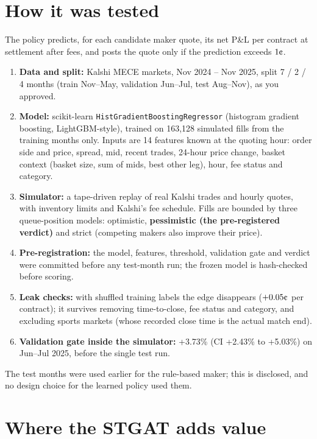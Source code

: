 \documentclass[11pt,a4paper]{article}
\newcommand{\cent}{\text{\textcent}}
\begin{document}
\section{How it was tested}

The policy predicts, for each candidate maker quote, its net P\&L per contract at settlement after fees, and posts
the quote only if the prediction exceeds $1\cent$.

\begin{enumerate}
  \item \textbf{Data and split:} Kalshi MECE markets, Nov 2024 -- Nov 2025, split 7 / 2 / 4 months (train Nov--May,
        validation Jun--Jul, test Aug--Nov), as you approved.
  \item \textbf{Model:} scikit-learn \texttt{HistGradient\allowbreak{}Boosting\allowbreak{}Regressor} (histogram gradient boosting,
        LightGBM-style), trained on 163,128 simulated fills from the training months only. Inputs are 14 features
        known at the quoting hour: order side and price, spread, mid, recent trades, 24-hour price change, basket
        context (basket size, sum of mids, best other leg), hour, fee status and category.
  \item \textbf{Simulator:} a tape-driven replay of real Kalshi trades and hourly quotes, with inventory limits and
        Kalshi's fee schedule. Fills are bounded by three queue-position models: optimistic,
        \textbf{pessimistic (the pre-registered verdict)} and strict (competing makers also improve their price).
  \item \textbf{Pre-registration:} the model, features, threshold, validation gate and verdict were committed
        before any test-month run; the frozen model is hash-checked before scoring.
  \item \textbf{Leak checks:} with shuffled training labels the edge disappears ($+0.05\cent$ per contract); it
        survives removing time-to-close, fee status and category, and excluding sports markets (whose recorded
        close time is the actual match end).
  \item \textbf{Validation gate inside the simulator:} +3.73\% (CI +2.43\% to +5.03\%) on Jun--Jul 2025, before the
        single test run.
\end{enumerate}

\noindent The test months were used earlier for the rule-based maker; this is disclosed, and no design choice for
the learned policy used them.

\section{Where the STGAT adds value}
\end{document}
